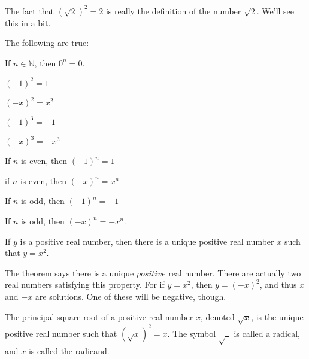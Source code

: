 \documentclass[crop=false,class=book,oneside]{standalone}
\begin{document}
            \begin{remark}
            The fact that $(\sqrt{2})^2 = 2$ is really the definition of the number $\sqrt{2}$. We'll see this in a bit.
            \end{remark}
            \begin{theorem}
            The following are true:
            \begin{enumerate}
            \begin{multicols}{3}
            \item If $n\in \mathbb{N}$, then $0^n = 0$.
            \item $(-1)^2 = 1$
            \item $(-x)^2 = x^2$
            \item $(-1)^3 = -1$
            \item $(-x)^3=-x^3$
            \item If $n$ is even, then $(-1)^n = 1$
            \item if $n$ is even, then $(-x)^n = x^n$
            \item If $n$ is odd, then $(-1)^n = -1$
            \item If $n$ is odd, then $(-x)^n = -x^n$. 
            \end{multicols}
            \end{enumerate}
            \end{theorem}
            \begin{theorem}
            If $y$ is a positive real number, then there is a unique positive real number $x$ such that $y=x^2$.
            \end{theorem}
            \begin{remark}
            The theorem says there is a unique $positive$ real number. There are actually two real numbers satisfying this property. For if $y=x^2$, then $y=(-x)^2$, and thus $x$ and $-x$ are solutions. One of these will be negative, though.
            \end{remark}
            \begin{definition}
            The principal square root of a positive real number $x$, denoted $\sqrt{x}$, is the unique positive real number such that $(\sqrt{x})^2 = x$. The symbol $\sqrt{\ \ }$ is called a radical, and $x$ is called the radicand.
            \end{definition}
\end{document}
